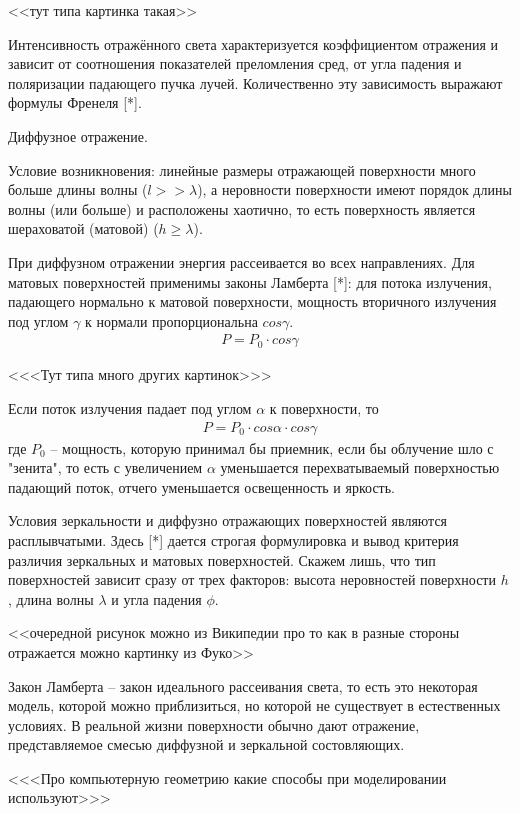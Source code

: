 <<тут типа картинка такая>>

Интенсивность отражённого света характеризуется коэффициентом отражения и зависит от соотношения показателей преломления сред, от угла падения и поляризации падающего пучка лучей. Количественно эту зависимость выражают формулы Френеля [*].

Диффузное отражение.

Условие возникновения: линейные размеры отражающей поверхности много больше длины волны ($ l >> \lambda $), а неровности поверхности имеют порядок длины волны (или больше) и расположены хаотично, то есть поверхность является шераховатой (матовой) ($ h \ge \lambda $). 

При диффузном отражении энергия рассеивается во всех направлениях. Для матовых поверхностей применимы законы Ламберта [*]: для потока излучения, падающего нормально к матовой поверхности, мощность вторичного излучения под углом $ \gamma $ к нормали пропорциональна $ cos \gamma $. 
\begin{gather}
 P = P_0 \cdot cos \gamma
\end {gather}

<<<Тут типа много других картинок>>>

Если поток излучения падает под углом $\alpha$ к поверхности, то 
\begin{gather}
 P = P_0 \cdot cos \alpha \cdot cos \gamma
\end {gather}
где $ P_0 $ -- мощность, которую принимал бы приемник, если бы облучение шло с "зенита", то есть с увеличением $\alpha$ уменьшается перехватываемый поверхностью падающий поток, отчего уменьшается освещенность и яркость. 

Условия зеркальности и диффузно отражающих поверхностей являются расплывчатыми. Здесь [*] дается строгая формулировка и вывод критерия различия зеркальных и матовых поверхностей. Скажем лишь, что тип поверхностей зависит сразу от трех факторов: высота неровностей поверхности $h$, длина волны $\lambda$ и угла падения $\phi$.

<<очередной рисунок можно из Википедии про то как в разные стороны отражается можно картинку из Фуко>>

Закон Ламберта -- закон идеального рассеивания света, то есть это некоторая модель, которой можно приблизиться, но которой не существует в естественных условиях. В реальной жизни поверхности обычно дают отражение, представляемое смесью диффузной и зеркальной состовляющих. 

<<<Про компьютерную геометрию какие способы при моделировании используют>>>

